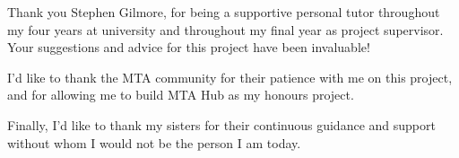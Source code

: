 \begin{acknowledgements}
    Thank you Stephen Gilmore, for being a supportive personal tutor throughout my four years at university and throughout my final year as project supervisor.
    Your suggestions and advice for this project have been invaluable!


    I'd like to thank the MTA community for their patience with me on this project,
    and for allowing me to build MTA Hub as my honours project.

    Finally, I'd like to thank my sisters for their continuous guidance and support without whom I would not be the person I am today.
\end{acknowledgements}

\standarddeclaration
